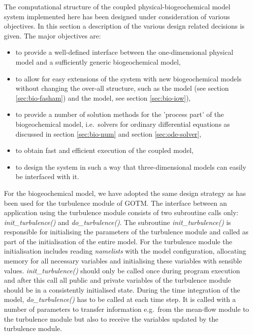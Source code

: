 The computational structure of the coupled physical-biogeochemical
model system implemented here
has been designed under consideration of various objectives. 
In this section  
a description of the various design related decisions is given.
The major objectives are:
\begin{itemize}
  \item to provide a well-defined interface between the one-dimensional
   physical model and a sufficiently generic biogeochemical model,
  \item to allow for easy extensions of the system with new 
     biogeochemical models without changing 
  the over-all structure, such as the \cite{Fashametal1990} model
  (see section \ref{sec:bio-fasham}) and the \cite{Neumannetal2002} model, 
  see section \ref{sec:bio-iow}),
  \item to provide a number of solution methods for the 'process part' of the
  biogeochemical model, i.e.\ solvers for ordinary differential equations
  as discussed in section \ref{sec:bio-num} and section \ref{sec:ode-solver},
  \item to obtain fast and efficient execution of the coupled model,
  \item to design the system in such a way that three-dimensional 
   models can easily be interfaced with it.
\end{itemize}
For the biogeochemical model,
we have adopted the same design strategy as has been used for the turbulence 
module of GOTM. The interface between an application using the turbulence
module consists of two subroutine calls only: \emph{init\_turbulence()} and
\emph{do\_turbulence()}. The subroutine \emph{init\_turbulence()} is
responsible for initialising the parameters of the turbulence module and  
called as part of the 
initialisation of the entire model. For the turbulence module the 
initialisation includes reading \emph{namelists} with the model configuration, 
allocating memory for all necessary variables and initialising 
these variables with sensible values. \emph{init\_turbulence()} should only be
called once during program execution and after this call all public and private
variables of the turbulence module should be in a 
consistently initialised state.
During the time integration of the model, \emph{do\_turbulence()} has to be
called at each time step. It is called with a number
of parameters to transfer information e.g.\ from the mean-flow module 
to the turbulence module but also to receive the variables updated
by the turbulence module.

